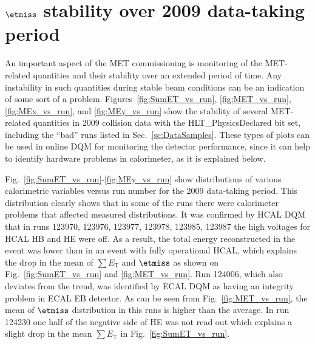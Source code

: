 \section{$\etmiss$ stability over 2009 data-taking period}
\label{sc:METStab}

An important aspect of the MET commissioning is monitoring of the
MET-related quantities and their stability over an extended period of
time. Any instability in such quantities during stable beam conditions
can be an indication of some sort of a problem.
Figures~\ref{fig:SumET_vs_run}, \ref{fig:MET_vs_run},
\ref{fig:MEx_vs_run}, and \ref{fig:MEy_vs_run} show the stability of
several MET-related quantities in 2009 collision data with the
HLT\_PhysicsDeclared bit set, including the ``bad'' runs listed in
Sec.~\ref{sc:DataSamples}. These types of plots can be used in online DQM
for monitoring the detector performance, since it can help to identify
hardware problems in calorimeter, as it is explained below.

Fig.~\ref{fig:SumET_vs_run}-\ref{fig:MEy_vs_run} show distributions of
various calorimetric variables versus run number for the 2009 data-taking
period. This distribution clearly shows that in some of the runs there
were calorimeter problems that affected measured distributions. It was
confirmed by HCAL DQM that in runs 123970, 123976, 123977,
123978, 123985, 123987 the high voltages for HCAL HB and HE were off. As
a result, the total energy reconstructed in the event was lower than in
an event with fully operational HCAL, which explains the drop in
the mean of $\sum E_\text{T}$ and $\etmiss$ as shown on
Fig.~\ref{fig:SumET_vs_run} and \ref{fig:MET_vs_run}. Run 124006, which
also deviates from the trend, was identified by ECAL DQM as having an
integrity problem in ECAL EB detector. As can be seen from
Fig.~\ref{fig:MET_vs_run}, the mean of $\etmiss$
distribution in this runs is higher than the average. In run 124230 one half
of the negative side of HE was not read out which explains a slight drop in
the mean $\sum E_\text{T}$ in Fig.~\ref{fig:SumET_vs_run}.

